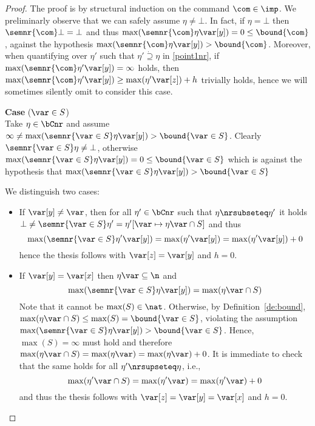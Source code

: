 \begin{proof}
  The proof is by structural induction on the command \(\com\in \imp\).
  We preliminarly observe that we can safely assume
  \(\eta \neq \bot\).
  In fact, if \(\eta = \bot\) then \(\semnr{\com} \bot = \bot\) and
  thus \(\max(\semnr{\com} \eta \var[y]) = 0 \leq \bound{\com}\),
  against the hypothesis
  \(\max(\semnr{\com}\eta \var[y]) > \bound{\com}\). Moreover, when
  quantifying over \(\eta'\) such that \(\eta' \dot{\supseteq} \eta\) in
  \ref{point1nr}, if \(\max(\semnr{\com}\eta' \var[y]) = \infty\)
  holds, then
  \(\max(\semnr{\com}\eta' \var[y]) \geq \max(\eta' \var[z]) + h\)
  trivially holds, hence we will sometimes silently omit to consider
  this case.
  
  \medskip
  
  \noindent
  \textbf{Case} (\(\var \in S\))\\
  Take \(\eta \in \bCnr\) and assume
  \(\infty\neq\max(\semnr{\var \in S}\eta \var[y]) > \bound{\var \in
    S}\).
  Clearly \(\semnr{\var \in S}\eta \neq \bot\), otherwise
  \(\max(\semnr{\var \in S}\eta \var[y]) =0 \leq \bound{\var \in S}\)
  which is against the hypothesis that
  \(\max(\semnr{\var \in S}\eta \var[y]) > \bound{\var \in S}\)
  
  We distinguish two cases:
  \begin{itemize}
    
  \item If \(\var[y] \neq \var\), then for all \(\eta' \in \bCnr\)
    such that \(\eta \nrsubseteq \eta'\) it holds
    \(\bot \neq \semnr{\var \in S}\eta' = \eta'[\var \mapsto \eta\var
      \cap S]\) and thus
    \[
    \max(\semnr{\var \in S}\eta' \var[y]) = \max(\eta' \var[y]) = \max(\eta' \var[y]) + 0
    \]
    hence the thesis follows with \(\var[z]=\var[y]\) and \(h = 0\).

  \item If \(\var[y] = \var[x]\) then  \(\eta\var \subseteq \n\) and
    \begin{equation*}
      \max(\semnr{\var \in S}\eta \var[y]) = \max (\eta\var \cap S)
    \end{equation*}
    Note that it cannot be \(\max(S)\in \nat\). Otherwise, by
    Definition~\ref{de:bound},
    \(\max (\eta\var \cap S) \leq \max(S)= \bound{\var \in S}\),
    violating the assumption
    \(\max(\semnr{\var \in S}\eta \var[y]) > \bound{\var \in S}\).
    Hence, \(\max(S) = \infty\) must hold and therefore
    \(\max (\eta\var \cap S) = \max(\eta\var)= \max(\eta\var)+0\).
    It is immediate to check that the same holds for all
    \(\eta' \nrsupseteq \eta\), i.e.,
    \begin{equation*}
      \max (\eta'\var \cap S) = \max(\eta'\var)=
      \max(\eta'\var)+0
    \end{equation*}
    and thus the thesis follows with \(\var[z]=\var[y]=\var[x]\) and
    \(h=0\).
  \end{itemize}  
  

\end{proof}
